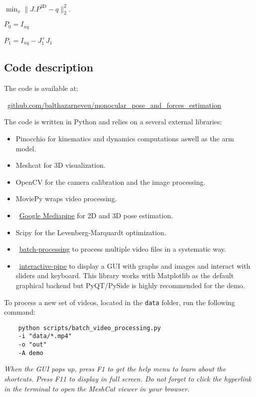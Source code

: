 $\min_x \|J.P^{\textrm{3D}} - q\|_2^2.$

$ P_0 = I_{nq} $

$ P_1 = I_{nq} - J_1^+ J_1 $

\subsection{Code description}
\label{app:code}
The code is available at:

~\href{https://github.com/balthazarneveu/monocular_pose_and_forces_estimation}{github.com/balthazarneveu/monocular\_pose\_and\_forces\_estimation}

The code is written in Python and relies on a several external libraries:
\begin{itemize}
    \item Pinocchio for kinematics and dynamics computations aswell as the arm model.
    \item Meshcat for 3D visualization.
    \item OpenCV for the camera calibration and the image processing.
    \item MoviePy wraps video processing.
    \item ~\href{https://developers.google.com/mediapipe}{Google Mediapipe} for 2D and  3D pose estimation.
    \item Scipy for the Levenberg-Marquardt optimization.
    \item ~\href{https://github.com/emmcb/batch-processing}{batch-processing} to process multiple video files in a systematic way.
    \item ~\href{https://github.com/balthazarneveu/interactive_pipe}{interactive-pipe} to display a GUI with graphs and images and interact with sliders and keyboard.
    This library works with Matplotlib as the default graphical backend but PyQT/PySide is highly recommended for the demo.
\end{itemize}

To process a new set of videos, located in the \texttt{data} folder, run the following command:
\begin{verbatim}
    python scripts/batch_video_processing.py
    -i "data/*.mp4"
    -o "out"
    -A demo
\end{verbatim}
\textit{When the GUI pops up, press F1 to get the help menu to learn about the shortcuts. Press F11 to display in full screen.
Do not forget to click the hyperlink in the terminal to open the MeshCat viewer in your browser.}


